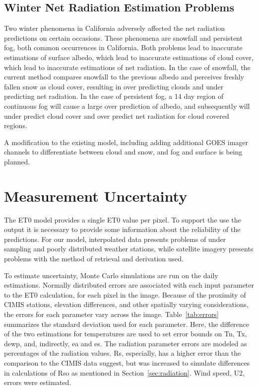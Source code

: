 \documentclass[reviewcopy]{elsart}
\begin{document}
\subsection{Winter Net Radiation Estimation Problems}

Two winter phenomena in California adversely affected the
net radiation predictions on certain occasions.  These phenomena
are snowfall and persistent fog, both common occurrences in
California.  Both problems lead to inaccurate estimations of surface
albedo, which lead to inaccurate estimations of cloud cover, which
lead to inaccurate estimations of net radiation.  In the case of
snowfall, the current method compares snowfall to the previous albedo
and perceives freshly fallen snow as cloud cover, resulting in over
predicting clouds and under predicting net radiation.  In the case of
persistent fog, a 14 day region of continuous fog will cause a large
over prediction of albedo, and subsequently will under predict cloud
cover and over predict net radiation for cloud covered regions.

A modification to the existing model, including adding additional
\ac{GOES} imager channels to differentiate between cloud and snow, and
fog and surface is being planned.

\section{Measurement Uncertainty}
\label{sec:meas-uncert}

The \ac{ET0} model provides a single \ac{ET0} value per pixel.  To
support the use the output it is necessary to provide some information
about the reliability of the predictions.  For our model,
interpolated data presents problems of under sampling and poorly
distributed weather stations, while satellite imagery presents
problems with the method of retrieval and derivation used.

To estimate uncertainty, Monte Carlo simulations are run on the daily
estimations.  Normally distributed errors are associated with each
input parameter to the \ac{ET0} calculation, for each pixel in the
image.  Because of the proximity of \ac{CIMIS} stations, elevation
differences, and other spatially varying considerations, the errors
for each parameter vary across the image.  Table~\ref{tab:errors}
summarizes the standard deviation used for each parameter.  Here, the
difference of the two estimations for temperatures are used to
set error bounds on \ac{Tn}, \ac{Tx}, \ac{dewp}, and,
indirectly, \ac{ea} and \ac{es}.  The radiation parameter errors are
modeled as percentages of the radiation values.  \ac{Rs}, especially,
has a higher error than the comparison to the \ac{CIMIS} data suggest,
but was increased to simulate differences in calculations of \ac{Rso}
as mentioned in Section~\ref{sec:radiation}.  Wind speed, \ac{U2},
errors were estimated.
\end{document}
